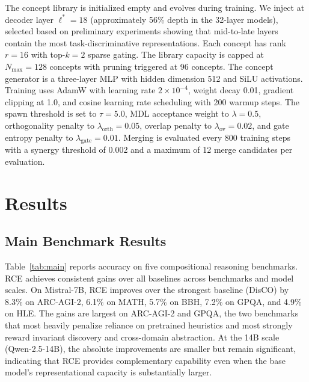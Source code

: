 \documentclass[11pt]{article}
\begin{document}
The concept library is initialized empty and evolves during training. We inject at decoder layer $\ell^* = 18$ (approximately 56\% depth in the 32-layer models), selected based on preliminary experiments showing that mid-to-late layers contain the most task-discriminative representations. Each concept has rank $r = 16$ with top-$k = 2$ sparse gating. The library capacity is capped at $N_{\max} = 128$ concepts with pruning triggered at 96 concepts. The concept generator is a three-layer MLP with hidden dimension 512 and SiLU activations. Training uses AdamW with learning rate $2 \times 10^{-4}$, weight decay 0.01, gradient clipping at 1.0, and cosine learning rate scheduling with 200 warmup steps. The spawn threshold is set to $\tau = 5.0$, MDL acceptance weight to $\lambda = 0.5$, orthogonality penalty to $\lambda_{\text{orth}} = 0.05$, overlap penalty to $\lambda_{\text{ov}} = 0.02$, and gate entropy penalty to $\lambda_{\text{gate}} = 0.01$. Merging is evaluated every 800 training steps with a synergy threshold of 0.002 and a maximum of 12 merge candidates per evaluation.

\section{Results}

\subsection{Main Benchmark Results}

Table~\ref{tab:main} reports accuracy on five compositional reasoning benchmarks. RCE achieves consistent gains over all baselines across benchmarks and model scales. On Mistral-7B, RCE improves over the strongest baseline (DisCO) by 8.3\% on ARC-AGI-2, 6.1\% on MATH, 5.7\% on BBH, 7.2\% on GPQA, and 4.9\% on HLE. The gains are largest on ARC-AGI-2 and GPQA, the two benchmarks that most heavily penalize reliance on pretrained heuristics and most strongly reward invariant discovery and cross-domain abstraction. At the 14B scale (Qwen-2.5-14B), the absolute improvements are smaller but remain significant, indicating that RCE provides complementary capability even when the base model's representational capacity is substantially larger.
\end{document}
